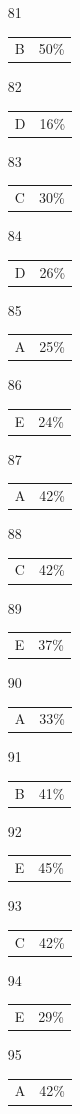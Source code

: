\documentclass[12pt]{article}
\begin{document}
\begin{multicols}{5}
\begin{enumerate}
\item[81] \begin{tabular}{cc} B & 50\%\end{tabular}
\item[82] \begin{tabular}{cc} D & 16\%\end{tabular}
\item[83] \begin{tabular}{cc} C & 30\%\end{tabular}
\item[84] \begin{tabular}{cc} D & 26\%\end{tabular}
\item[85] \begin{tabular}{cc} A & 25\%\end{tabular}
\item[]
\item[86] \begin{tabular}{cc} E & 24\%\end{tabular}
\item[87] \begin{tabular}{cc} A & 42\%\end{tabular}
\item[88] \begin{tabular}{cc} C & 42\%\end{tabular}
\item[89] \begin{tabular}{cc} E & 37\%\end{tabular}
\item[90] \begin{tabular}{cc} A & 33\%\end{tabular}
\item[]
\item[91] \begin{tabular}{cc} B & 41\%\end{tabular}
\item[92] \begin{tabular}{cc} E & 45\%\end{tabular}
\item[93] \begin{tabular}{cc} C & 42\%\end{tabular}
\item[94] \begin{tabular}{cc} E & 29\%\end{tabular}
\item[95] \begin{tabular}{cc} A & 42\%\end{tabular}

\end{enumerate}
\end{multicols}
\end{document}
